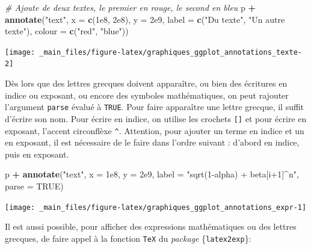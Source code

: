 \documentclass[
  11pt,
]{book}
\newenvironment{Shaded}{\begin{snugshade}}{\end{snugshade}}
\newcommand{\CommentTok}[1]{\textcolor[rgb]{0.56,0.35,0.01}{\textit{#1}}}
\newcommand{\DataTypeTok}[1]{\textcolor[rgb]{0.13,0.29,0.53}{#1}}
\newcommand{\FloatTok}[1]{\textcolor[rgb]{0.00,0.00,0.81}{#1}}
\newcommand{\KeywordTok}[1]{\textcolor[rgb]{0.13,0.29,0.53}{\textbf{#1}}}
\newcommand{\NormalTok}[1]{#1}
\newcommand{\OperatorTok}[1]{\textcolor[rgb]{0.81,0.36,0.00}{\textbf{#1}}}
\newcommand{\OtherTok}[1]{\textcolor[rgb]{0.56,0.35,0.01}{#1}}
\newcommand{\StringTok}[1]{\textcolor[rgb]{0.31,0.60,0.02}{#1}}
\numberwithin{equation}{section}
\numberwithin{countremarque}{section}
\begin{document}
\begin{Shaded}
\begin{Highlighting}[]
\CommentTok{\# Ajoute de deux textes, le premier en rouge, le second en bleu}
\NormalTok{p }\OperatorTok{+}\StringTok{ }\KeywordTok{annotate}\NormalTok{(}\StringTok{"text"}\NormalTok{, }\DataTypeTok{x =} \KeywordTok{c}\NormalTok{(}\FloatTok{1e8}\NormalTok{, }\FloatTok{2e8}\NormalTok{), }\DataTypeTok{y =} \FloatTok{2e9}\NormalTok{,}
             \DataTypeTok{label =} \KeywordTok{c}\NormalTok{(}\StringTok{"Du texte"}\NormalTok{, }\StringTok{"Un autre texte"}\NormalTok{),}
             \DataTypeTok{colour =} \KeywordTok{c}\NormalTok{(}\StringTok{"red"}\NormalTok{, }\StringTok{"blue"}\NormalTok{))}
\end{Highlighting}
\end{Shaded}

\begin{center}\texttt{[image: \_main\_files/figure-latex/graphiques\_ggplot\_annotations\_texte-2]} \end{center}

Dès lors que des lettres grecques doivent apparaître, ou bien des écritures en indice ou exposant, ou encore des symboles mathématiques, on peut rajouter l'argument \texttt{parse} évalué à \texttt{TRUE}. Pour faire apparaître une lettre grecque, il suffit d'écrire son nom. Pour écrire en indice, on utilise les crochets \texttt{{[}{]}} et pour écrire en exposant, l'accent circonflèxe \texttt{\^{}}. Attention, pour ajouter un terme en indice et un en exposant, il est nécessaire de le faire dans l'ordre suivant : d'abord en indice, puis en exposant.

\begin{Shaded}
\begin{Highlighting}[]
\NormalTok{p }\OperatorTok{+}\StringTok{ }\KeywordTok{annotate}\NormalTok{(}\StringTok{"text"}\NormalTok{, }\DataTypeTok{x =} \FloatTok{1e8}\NormalTok{, }\DataTypeTok{y =} \FloatTok{2e9}\NormalTok{,}
             \DataTypeTok{label =} \StringTok{"sqrt(1{-}alpha) + beta[i+1]\^{}n"}\NormalTok{, }\DataTypeTok{parse =} \OtherTok{TRUE}\NormalTok{)}
\end{Highlighting}
\end{Shaded}

\begin{center}\texttt{[image: \_main\_files/figure-latex/graphiques\_ggplot\_annotations\_expr-1]} \end{center}

Il est aussi possible, pour afficher des expressions mathématiques ou des lettres grecques, de faire appel à la fonction \texttt{TeX} du \emph{package} \{\texttt{latex2exp}\}:
\end{document}
